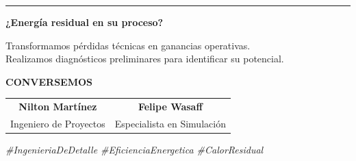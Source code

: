 \documentclass[11pt,letterpaper]{article}
\begin{document}
\vspace{1.5cm}

\begin{center}
    \rule{0.6\textwidth}{0.5pt}
    
    \vspace{0.5cm}
    
    {\Large \textbf{¿Energía residual en su proceso?}}
    
    \vspace{0.3cm}
    
    Transformamos pérdidas técnicas en ganancias operativas.\\
    Realizamos diagnósticos preliminares para identificar su potencial.
    
    \vspace{1cm}
    
    \textbf{\Large CONVERSEMOS}
    
    \vspace{0.3cm}
    
    \begin{tabular}{c c}
        \textbf{Nilton Martínez} & \textbf{Felipe Wasaff} \\
        \small Ingeniero de Proyectos & \small Especialista en Simulación \\
    \end{tabular}
    
    \vspace{0.5cm}
    \small\textit{\#IngenieriaDeDetalle \#EficienciaEnergetica \#CalorResidual}
\end{center}
\end{document}
